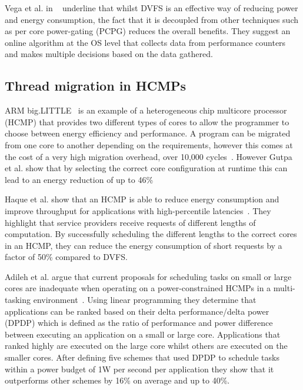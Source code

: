 Vega et al. in ~\cite{vega2013crank} underline that whilst DVFS is an effective way of reducing power and energy consumption, the fact that it is decoupled from other techniques such as per core power-gating (PCPG) reduces the overall benefits.
They suggest an online algorithm at the OS level that collects data from performance counters and makes multiple decisions based on the data gathered.
\vspace{-1em}
\subsection{Thread migration in HCMPs}
ARM big.LITTLE~\cite{armbig} is an example of a heterogeneous chip multicore processor (HCMP) that provides two different types of cores to allow the programmer to choose between energy efficiency and performance.
A program can be migrated from one core to another depending on the requirements, however this comes at the cost of a very high migration overhead, over 10,000 cycles~\cite{armbig}.
However Gutpa et al. show that by selecting the correct core configuration at runtime this can lead to an energy reduction of up to 46\%

Haque et al. show that an HCMP is able to reduce energy consumption and improve throughput for applications with high-percentile latencies~\cite{tailAMP2017}.
They highlight that service providers receive requests of different lengths of computation.
By successfully scheduling the different lengths to the correct cores in an HCMP, they can reduce the energy consumption of short requests by a factor of 50\% compared to DVFS.

Adileh et al. argue that current proposals for scheduling tasks on small or large cores are inadequate when operating on a power-constrained HCMPs in a multi-tasking environment~\cite{adileh2016power}.
Using linear programming they determine that applications can be ranked based on their delta performance/delta power (DPDP) which is defined as the ratio of performance and power difference between executing an application on a small or large core.
Applications that ranked highly are executed on the large core whilst others are executed on the smaller cores.
After defining five schemes that used DPDP to schedule tasks within a power budget of 1W per second per application they show that it outperforms other schemes by 16\% on average and up to 40\%.
 
